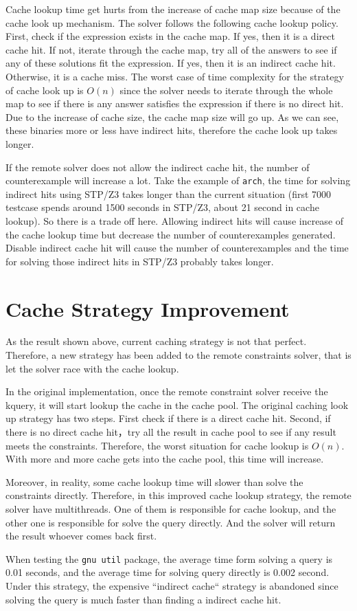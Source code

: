 Cache lookup time get hurts from the increase of cache map size because of the cache look up mechanism. The solver follows the following cache lookup policy. First, check if the expression exists in the cache map. If yes, then it is a direct cache hit. If not, iterate through the cache map, try all of the answers to see if any of these solutions fit the expression. If yes, then it is an indirect cache hit. Otherwise, it is a cache miss. The worst case of time complexity for the strategy of cache look up is $O(n)$ since the solver needs to iterate through the whole map to see if there is any answer satisfies the expression if there is no direct hit. Due to the increase of cache size, the cache map size will go up. As we can see, these binaries more or less have indirect hits, therefore the cache look up takes longer. 

If the remote solver does not allow the indirect cache hit, the number of counterexample will increase a lot. Take the example of \texttt{arch}, the time for solving indirect hits using STP/Z3 takes longer than the current situation (first 7000 testcase spends around 1500 seconds in STP/Z3, about 21 second in cache lookup). So there is a trade off here. Allowing indirect hits will cause increase of the cache lookup time but decrease the number of counterexamples generated. Disable indirect cache hit will cause the number of counterexamples and the time for solving those indirect hits in STP/Z3 probably takes longer.

\section{Cache Strategy Improvement}
As the result shown above, current caching strategy is not that perfect. Therefore, a new strategy has been added to the remote constraints solver, that is let the solver race with the cache lookup.

In the original implementation, once the remote constraint solver receive the kquery, it will start lookup the cache in the cache pool. The original caching look up strategy has two steps. First check if there is a direct cache hit. Second, if there is no direct cache hit，try all the result in cache pool to see if any result meets the constraints. Therefore, the worst situation for cache lookup is $O(n)$. With more and more cache gets into the cache pool, this time will increase.

Moreover, in reality, some cache lookup time will slower than solve the constraints directly. Therefore, in this improved cache lookup strategy, the remote solver have multithreads. One of them is responsible for cache lookup, and the other one is responsible for solve the query directly. And the solver will return the result whoever comes back first. 

When testing the \texttt{gnu util} package, the average time form solving a query is 0.01 seconds, and the average time for solving query directly is 0.002 second. Under this strategy, the expensive ``indirect cache`` strategy is abandoned since solving the query is much faster than finding a indirect cache hit. 